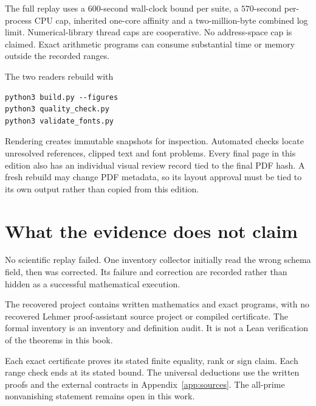 The full replay uses a $600$-second wall-clock bound per suite, a $570$-second per-process CPU cap, inherited one-core affinity and a two-million-byte combined log limit. Numerical-library thread caps are cooperative. No address-space cap is claimed. Exact arithmetic programs can consume substantial time or memory outside the recorded ranges.

The two readers rebuild with
\begin{lstlisting}[basicstyle=\ttfamily\small,breaklines=true]
python3 build.py --figures
python3 quality_check.py
python3 validate_fonts.py
\end{lstlisting}
Rendering creates immutable snapshots for inspection. Automated checks locate unresolved references, clipped text and font problems. Every final page in this edition also has an individual visual review record tied to the final PDF hash. A fresh rebuild may change PDF metadata, so its layout approval must be tied to its own output rather than copied from this edition.

\section{What the evidence does not claim}
No scientific replay failed. One inventory collector initially read the wrong schema field, then was corrected. Its failure and correction are recorded rather than hidden as a successful mathematical execution.

The recovered project contains written mathematics and exact programs, with no recovered Lehmer proof-assistant source project or compiled certificate. The formal inventory is an inventory and definition audit. It is not a Lean verification of the theorems in this book.

Each exact certificate proves its stated finite equality, rank or sign claim. Each range check ends at its stated bound. The universal deductions use the written proofs and the external contracts in Appendix~\ref{app:sources}. The all-prime nonvanishing statement remains open in this work.
